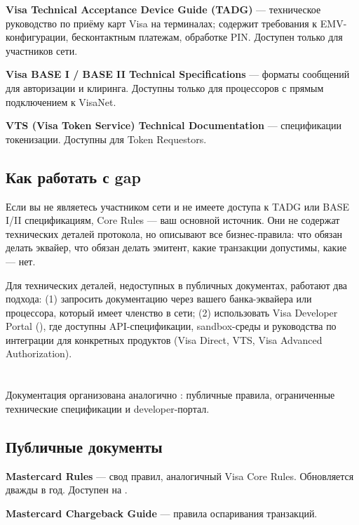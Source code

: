\textbf{Visa Technical Acceptance Device Guide (TADG)} —
техническое руководство по приёму карт Visa на терминалах;
содержит требования к EMV-конфигурации, бесконтактным
платежам, обработке PIN. Доступен только для участников
сети.

\textbf{Visa BASE I / BASE II Technical Specifications} —
форматы сообщений для авторизации и клиринга. Доступны
только для процессоров с прямым подключением к VisaNet.

\textbf{VTS (Visa Token Service) Technical Documentation} —
спецификации токенизации. Доступны для Token
Requestors.

\subsection*{Как работать с gap}

Если вы не являетесь участником сети 
и не имеете доступа к TADG или BASE I/II спецификациям,
Core Rules — ваш основной источник. Они не содержат
технических деталей протокола, но описывают все бизнес-правила:
что обязан делать эквайер, что обязан делать эмитент,
какие транзакции допустимы, какие — нет.

Для технических деталей, недоступных в публичных документах,
работают два подхода: (1) запросить документацию через
вашего банка-эквайера или процессора, который имеет
членство в сети; (2) использовать Visa Developer Portal
(), где доступны API-спецификации,
sandbox-среды и руководства по интеграции для конкретных
продуктов (Visa Direct, VTS, Visa Advanced Authorization).

\section{}
\label{sec:ps-mastercard}

Документация  организована аналогично
: публичные правила, ограниченные технические
спецификации и developer-портал.

\subsection*{Публичные документы}

\textbf{Mastercard Rules} — свод правил, аналогичный
Visa Core Rules. Обновляется дважды в год. Доступен
на .

\textbf{Mastercard Chargeback Guide} — правила оспаривания
транзакций.


